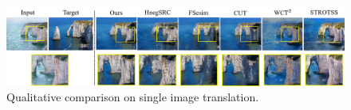 \documentclass[letterpaper]{article} %
\begin{document}
\begin{figure}[!t]
	\centering
	\includegraphics[width=0.9\linewidth]{figs/single2.png}
	\caption{Qualitative comparison on single image translation.}
	\label{fig:single}
\end{figure}


%
%
%
%




\end{document}
